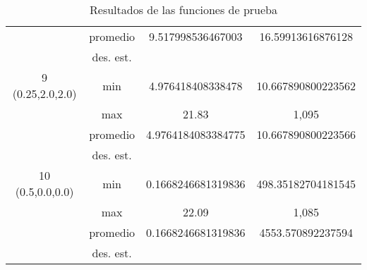 \documentclass{report}
\begin{document}
\begin{table}[H]
\begin{tabular}{|c|c|c|c|}
                              & promedio                    &     9.517998536467003       &   16.59913616876128     \\ \cline{2-4} 
                              & des. est.                   &            &        \\ \hline
        9 (0.25,2.0,2.0)                   & min                         &      4.976418408338478      &  10.667890800223562      \\ \cline{2-4} 
                              & max                         &      21.83      &   1,095     \\ \cline{2-4} 
                              & promedio                    &     4.9764184083384775       &    10.667890800223566    \\ \cline{2-4} 
                              & des. est.                   &            &        \\ \hline
        10 (0.5,0.0,0.0)                   & min                         &      0.1668246681319836      &     498.35182704181545   \\ \cline{2-4} 
                              & max                         &      22.09      &    1,085    \\ \cline{2-4} 
                              & promedio                    &      0.1668246681319836      &    4553.570892237594    \\ \cline{2-4} 
                              & des. est.                   &            &        \\ \hline

        \end{tabular}
        \caption{Resultados de las funciones de prueba}
        \label{tab:resultados}
    \end{table}
\end{document}
